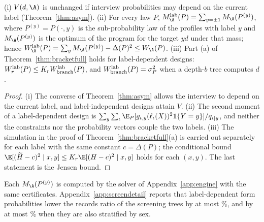 \begin{proposition}\label{prop:labeldesign}
\textup{(i)} $V(d,\A)$ is unchanged if interview probabilities may depend on
the current label (Theorem~\ref{thm:asym}).
\textup{(ii)} For every law $P$, $M_{\A}^{\rm lab}(P)=\sum_{y=\pm1}M_\A(P^{(y)})$,
where $P^{(y)}=P(\cdot,y)$ is the sub-probability law of the profiles with
label $y$ and $M_\A(P^{(y)})$ is the optimum of the program for the target
$yd$ under that mass; hence $W^{\rm lab}_\A(P)=\sum_yM_\A(P^{(y)})-\Delta(P)^2\le W_\A(P)$.
\textup{(iii)} Part \textup{(a)} of Theorem~\ref{thm:bracketfull} holds for
label-dependent designs: $W^{\rm lab}_r(P)\le K_rW^{\rm lab}_{\rm branch}(P)$,
and $W^{\rm lab}_{\rm branch}(P)=\sigma_P^2$ when a depth-$b$ tree computes
$d$.
\end{proposition}
\begin{proof}
(i) The converse of Theorem~\ref{thm:asym} allows the interview to depend on
the current label, and label-independent designs attain $V$. (ii) The second
moment of a label-dependent design is
$\sum_y\sum_\iota\E_P[g_{\iota,y}(\ell_\iota(X))^2\mathbf 1\{Y=y\}]/q_{\iota\mid y}$,
and neither the constraints nor the probability vectors couple the two
labels. (iii) The simulation in the proof of
Theorem~\ref{thm:bracketfull}(a) is carried out separately for each label
with the same constant $c=\Delta(P)$; the conditional bound
$\E[(\widetilde H-c)^2\mid x,y]\le K_r\E[(H-c)^2\mid x,y]$ holds for each
$(x,y)$. The last statement is the Jensen bound.
\end{proof}
Each $M_\A(P^{(y)})$ is computed by the solver of Appendix~\ref{app:engine}
with the same certificates. Appendix~\ref{app:screendetail} reports that
label-dependent form probabilities lower the records ratio of the screening
trees by at most \nLabelMax\%, and by at most \nStratMax\% when they are also
stratified by sex.
